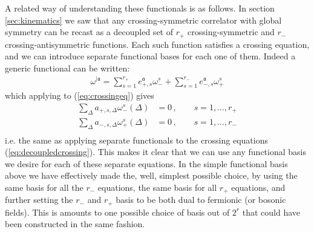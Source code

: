 \documentclass[12pt]{article}
\numberwithin{equation}{section}
\newcommand{\reef}[1]{(\ref{#1})}
\newcommand{\bea}{\begin{eqnarray}}
\newcommand{\eea}{\end{eqnarray}}
\newcommand{\ba}{\begin{equation}\begin{aligned}}
\newcommand{\ea}{\end{aligned}\end{equation}}
\newcommand{\mf}[1]{\mathfrak #1}
\begin{document}
	A related way of understanding these functionals is as follows. In section \ref{sec:kinematics} we saw that any crossing-symmetric correlator with global symmetry can be recast as a decoupled set of $r_+$ crossing-symmetric and $r_-$ crossing-antisymmetric functions. Each such function satisfies a crossing equation, and we can introduce separate functional bases for each one of them. Indeed a generic functional can be written:
	\bea
	\omega^{|\mf a}=\sum_{s=1}^{r_+} e_{+,s}^{\mf a} \omega_{-}^s+\sum_{s=1}^{r_-} e_{-,s}^{\mf a} \omega_{+}^s
	\eea
	which applying to \reef{eq:crossingeq} gives
	\ba
	\sum_{\Delta} a_{+,s,\Delta} \omega_{-}^s(\Delta)&=0\,,\qquad s=1,\ldots, r_+\\
	\sum_{\Delta} a_{-,s,\Delta} \omega_{+}^s(\Delta)&=0\,,\qquad s=1,\ldots,r_-\\
	\ea
	i.e. the same as applying separate functionals to the crossing equations  \reef{eq:decoupledcrossing}.
	This makes it clear that we can use any functional basis we desire for each of these separate equations. In the simple functional basis above we have effectively made the, well, simplest possible choice, by using the same basis for all the $r_-$ equations, the same basis for all $r_+$ equations, and further setting the $r_-$ and $r_+$ basis to be both dual to fermionic (or bosonic fields). This is amounts to one possible choice of basis out of $2^{r}$ that could have been constructed in the same fashion.
	
\end{document}
